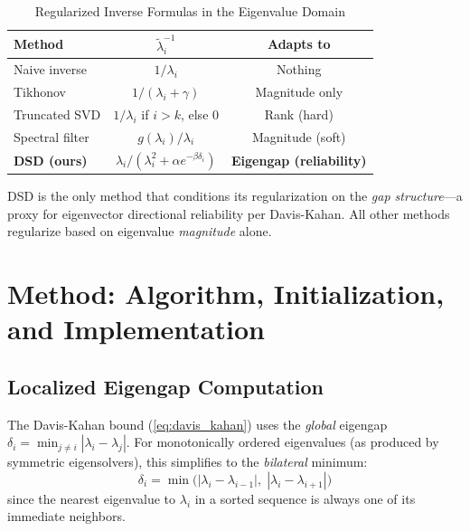 \documentclass[journal]{IEEEtran}
\begin{document}
\begin{table}[!t]
\centering
\caption{Regularized Inverse Formulas in the Eigenvalue Domain}
\label{tab:comparison_formula}
\small
\begin{tabular}{@{}lcc@{}}
\toprule
\textbf{Method} & \textbf{$\tilde{\lambda}_i^{-1}$} & \textbf{Adapts to} \\
\midrule
Naive inverse & $1/\lambda_i$ & Nothing \\
Tikhonov & $1/(\lambda_i + \gamma)$ & Magnitude only \\
Truncated SVD & $1/\lambda_i$ if $i > k$, else 0 & Rank (hard) \\
Spectral filter & $g(\lambda_i)/\lambda_i$ & Magnitude (soft) \\
\textbf{DSD (ours)} & $\lambda_i/(\lambda_i^2 + \alpha e^{-\beta\delta_i})$ & \textbf{Eigengap (reliability)} \\
\bottomrule
\end{tabular}
\end{table}

DSD is the only method that conditions its regularization on the \emph{gap structure}---a proxy for eigenvector directional reliability per Davis-Kahan. All other methods regularize based on eigenvalue \emph{magnitude} alone.


\section{Method: Algorithm, Initialization, and Implementation}
\label{sec:method}

\subsection{Localized Eigengap Computation}
\label{sec:eigengap_computation}

The Davis-Kahan bound (\ref{eq:davis_kahan}) uses the \emph{global} eigengap $\delta_i = \min_{j \neq i} |\lambda_i - \lambda_j|$. For monotonically ordered eigenvalues (as produced by symmetric eigensolvers), this simplifies to the \emph{bilateral} minimum:
\begin{equation}
\delta_i = \min\bigl(|\lambda_i - \lambda_{i-1}|, \; |\lambda_i - \lambda_{i+1}|\bigr)
\label{eq:bilateral_gap}
\end{equation}
since the nearest eigenvalue to $\lambda_i$ in a sorted sequence is always one of its immediate neighbors.
\end{document}
